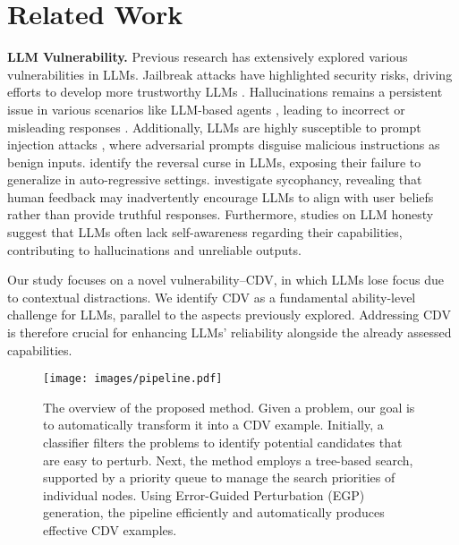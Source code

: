 \section{Related Work}



\textbf{LLM Vulnerability.} Previous research has extensively explored various vulnerabilities in LLMs. Jailbreak attacks \citep{wei2024jailbroken, zou2023universal, huang2024obscureprompt} have highlighted security risks, driving efforts to develop more trustworthy LLMs \citep{huang2024trustllm, liu2023trustworthy, huang2023trustgpt}. Hallucinations \citep{li2023halueval} remains a persistent issue in various scenarios like LLM-based agents \citep{zhang2024toolbehonest, huang2023metatool}, leading to incorrect or misleading responses \cite{10.1145/3589335.3651509}. Additionally, LLMs are highly susceptible to prompt injection attacks \citep{liu2024promptinjection}, where adversarial prompts disguise malicious instructions as benign inputs. \citet{berglund2023reversal} identify the reversal curse in LLMs, exposing their failure to generalize in auto-regressive settings. \citet{sharma2023towards} investigate sycophancy, revealing that human feedback may inadvertently encourage LLMs to align with user beliefs rather than provide truthful responses. Furthermore, studies on LLM honesty \citep{yang2023alignment, gaohonestllm} suggest that LLMs often lack self-awareness regarding their capabilities, contributing to hallucinations and unreliable outputs.


Our study focuses on a novel vulnerability--CDV, in which LLMs lose focus due to contextual distractions. We identify CDV as a fundamental ability-level challenge for LLMs, parallel to the aspects previously explored. Addressing CDV is therefore crucial for enhancing LLMs' reliability alongside the already assessed capabilities.

\begin{figure*}[t]
    \centering
    \texttt{[image: images/pipeline.pdf]}
    \caption{The overview of the proposed method. Given a problem, our goal is to automatically transform it into a CDV example. Initially, a classifier filters the problems to identify potential candidates that are easy to perturb. Next, the method employs a tree-based search, supported by a priority queue to manage the search priorities of individual nodes. Using Error-Guided Perturbation (EGP) generation, the pipeline efficiently and automatically produces effective CDV examples.}
    \label{fig:pipeline}
    \vspace{-1em}
\end{figure*}


